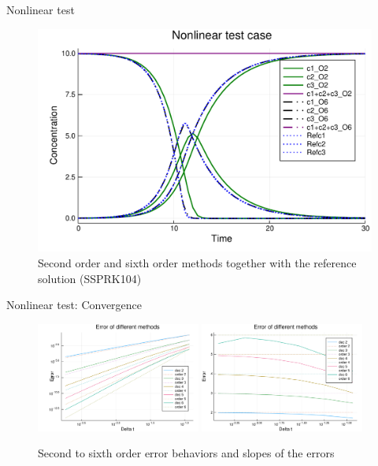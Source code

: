 \documentclass[aspectratio=169]{beamer}
\newcommand{\1}{\begin{pmatrix}
                 1\\
                 1
                \end{pmatrix}}
\begin{document}
\begin{frame}{Nonlinear test}
\begin{figure}[!htp]
\centering
    \includegraphics[height=0.7\textheight]{images/NonlinearWithReferenceSSPRK104.pdf}
  \caption{ Second order and sixth order methods together with the reference solution (SSPRK104)
 }
  \label{fig:Non_linear}
\end{figure}
\end{frame}

\begin{frame}{Nonlinear test: Convergence}
\begin{figure}[!htp]
\centering
    \includegraphics[width=0.48\textwidth]{images/NonlinearIntegralErrorOrders26.pdf}
    \includegraphics[width=0.48\textwidth]{images/NonlinearIntegralSlopesOrders26.pdf}
  \caption{ Second to sixth order error behaviors and slopes of the errors
 }
  \label{fig:Non_Linear_model_error}
\end{figure}


\end{frame}
\end{document}
